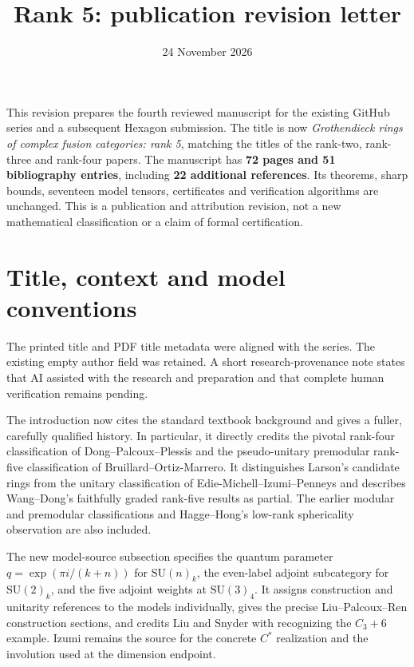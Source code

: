 \documentclass[11pt,a4paper]{article}
\title{Rank 5: publication revision letter}
\author{}\date{24 November 2026}
\begin{document}
\maketitle

This revision prepares the fourth reviewed manuscript for the existing
GitHub series and a subsequent Hexagon submission. The title is now
\emph{Grothendieck rings of complex fusion categories: rank 5},
matching the titles of the rank-two, rank-three and rank-four papers.
The manuscript has \textbf{72 pages and 51 bibliography entries},
including \textbf{22 additional references}. Its theorems, sharp bounds,
seventeen model tensors, certificates and verification algorithms are
unchanged. This is a publication and attribution revision, not a new
mathematical classification or a claim of formal certification.

\section*{Title, context and model conventions}

The printed title and PDF title metadata were aligned with the series.
The existing empty author field was retained. A short research-provenance
note states that AI assisted with the research and preparation and that
complete human verification remains pending.

The introduction now cites the standard textbook background and gives
a fuller, carefully qualified history. In particular, it directly credits
the pivotal rank-four classification of Dong--Palcoux--Plessis and the
pseudo-unitary premodular rank-five classification of
Bruillard--Ortiz-Marrero. It distinguishes Larson's candidate rings
from the unitary classification of Edie-Michell--Izumi--Penneys and
describes Wang--Dong's faithfully graded rank-five results as partial.
The earlier modular and premodular classifications and Hagge--Hong's
low-rank sphericality observation are also included.

The new model-source subsection specifies the quantum parameter
$q=\exp(\pi i/(k+n))$ for $\mathrm{SU}(n)_k$, the even-label adjoint
subcategory for $\mathrm{SU}(2)_k$, and the five adjoint weights at
$\mathrm{SU}(3)_4$. It assigns construction and unitarity references
to the models individually, gives the precise Liu--Palcoux--Ren
construction sections, and credits Liu and Snyder with recognizing
the $C_3+6$ example. Izumi remains the source for the concrete
$C^*$ realization and the involution used at the dimension endpoint.
\end{document}
